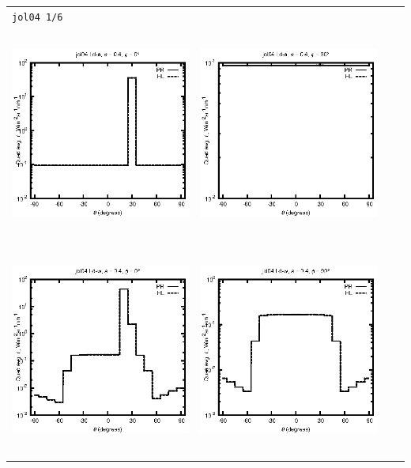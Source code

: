 \begin{tabular}{c c c c}
\multicolumn{4}{l}{\texttt{jol04 1/6}} \\
\includegraphics[height=7cm]{../eps/jol04_Ld_a_fwd.eps} &
\includegraphics[height=7cm]{../eps/jol04_Ld_a_cross.eps}\\
\includegraphics[height=7cm]{../eps/jol04_Ld_w_fwd.eps} &
\includegraphics[height=7cm]{../eps/jol04_Ld_w_cross.eps} \\

\end{tabular}
